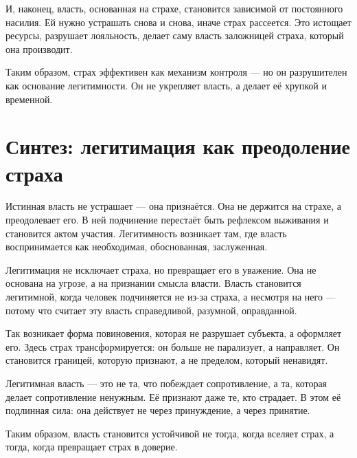 И, наконец, власть, основанная на страхе, становится зависимой от постоянного насилия. Ей нужно устрашать снова и снова, иначе страх рассеется. Это истощает ресурсы, разрушает лояльность, делает саму власть заложницей страха, который она производит.

Таким образом, страх эффективен как механизм контроля — но он разрушителен как основание легитимности. Он не укрепляет власть, а делает её хрупкой и временной.

\section{Синтез: легитимация как преодоление страха}

Истинная власть не устрашает — она признаётся. Она не держится на страхе, а преодолевает его. В ней подчинение перестаёт быть рефлексом выживания и становится актом участия. Легитимность возникает там, где власть воспринимается как необходимая, обоснованная, заслуженная.

Легитимация не исключает страха, но превращает его в уважение. Она не основана на угрозе, а на признании смысла власти. Власть становится легитимной, когда человек подчиняется не из-за страха, а несмотря на него — потому что считает эту власть справедливой, разумной, оправданной.

Так возникает форма повиновения, которая не разрушает субъекта, а оформляет его. Здесь страх трансформируется: он больше не парализует, а направляет. Он становится границей, которую признают, а не пределом, который ненавидят.

Легитимная власть — это не та, что побеждает сопротивление, а та, которая делает сопротивление ненужным. Её признают даже те, кто страдает. В этом её подлинная сила: она действует не через принуждение, а через принятие.

Таким образом, власть становится устойчивой не тогда, когда вселяет страх, а тогда, когда превращает страх в доверие.
